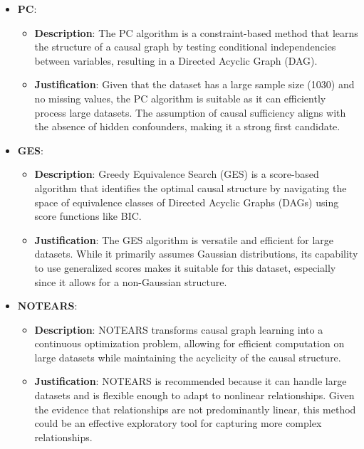 \documentclass{article}
\begin{document}
\begin{itemize}
        
\item \textbf{PC}:
    \begin{itemize}
        \item \textbf{Description}: The PC algorithm is a constraint-based method that learns the structure of a causal graph by testing conditional independencies between variables, resulting in a Directed Acyclic Graph (DAG).
        \item \textbf{Justification}: Given that the dataset has a large sample size (1030) and no missing values, the PC algorithm is suitable as it can efficiently process large datasets. The assumption of causal sufficiency aligns with the absence of hidden confounders, making it a strong first candidate.
    \end{itemize}

\item \textbf{GES}:
    \begin{itemize}
        \item \textbf{Description}: Greedy Equivalence Search (GES) is a score-based algorithm that identifies the optimal causal structure by navigating the space of equivalence classes of Directed Acyclic Graphs (DAGs) using score functions like BIC.
        \item \textbf{Justification}: The GES algorithm is versatile and efficient for large datasets. While it primarily assumes Gaussian distributions, its capability to use generalized scores makes it suitable for this dataset, especially since it allows for a non-Gaussian structure.
    \end{itemize}

\item \textbf{NOTEARS}:
    \begin{itemize}
        \item \textbf{Description}: NOTEARS transforms causal graph learning into a continuous optimization problem, allowing for efficient computation on large datasets while maintaining the acyclicity of the causal structure.
        \item \textbf{Justification}: NOTEARS is recommended because it can handle large datasets and is flexible enough to adapt to nonlinear relationships. Given the evidence that relationships are not predominantly linear, this method could be an effective exploratory tool for capturing more complex relationships.
    \end{itemize}

\end{itemize}
                    
\end{document}
